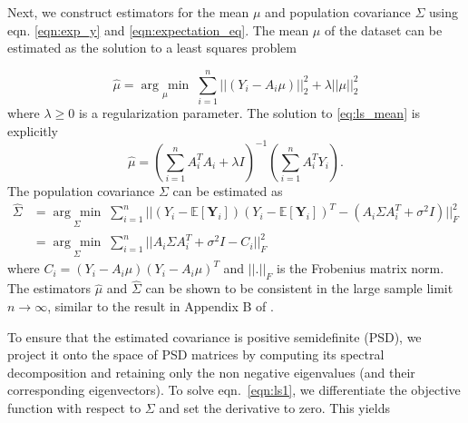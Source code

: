 \documentclass[review]{elsarticle}
\newcommand{\argmin}[1]{\underset{#1}{\operatorname{arg}\,\operatorname{min}}\;}
\begin{document}
Next, we construct estimators for the mean $\mu$ and population covariance 
$\Sigma$ using eqn. \ref{eqn:exp_y} and \ref{eqn:expectation_eq}.
The mean $\mu$ of the dataset can be estimated 
as the solution to
a least squares problem

\begin{equation}
 \hat\mu = \argmin{\mu} \sum_{i=1}^n||(Y_i-A_i\mu)||_2^2 + 
\lambda||\mu||_2^2
\label{eq:ls_mean}
\end{equation}
where $\lambda \geq 0$ is a regularization parameter. The solution to 
\ref{eq:ls_mean} is explicitly
\begin{equation}
 \hat\mu = (\sum_{i=1}^n A_i^T A_i + \lambda I)^{-1}(\sum_{i=1}^n 
A_i^T Y_i).
\label{eq:ls_mean_sol}
\end{equation}
The population covariance $\Sigma$ can be estimated as 
\begin{equation}
\begin{aligned}
\hat\Sigma 
&= \argmin{\Sigma} \sum_{i=1}^n || (Y_i - \mathbb{E}[\textbf{Y}_i]) (Y_i - \mathbb{E}[\textbf{Y}_i])^T
- (A_i \Sigma A_i^T + \sigma^2 I)||_F^2 \\
&= \argmin{\Sigma} \sum_{i=1}^n || A_i\Sigma A_i^T + \sigma^2 I - C_i  ||_F^2 
\end{aligned}
\label{eqn:ls1}
\end{equation}
where $C_i=(Y_i - A_i \mu) (Y_i - A_i \mu)^T$ and $||.||_F$ is the Frobenius matrix norm. 
The estimators $\hat \mu$ and $\hat \Sigma$ can be shown to be consistent in the large sample limit
$n \to \infty$, similar to the result in Appendix B of \cite{gene}. 

To ensure that the estimated
covariance is positive semidefinite (PSD), we project it onto the space of 
PSD matrices by computing
its spectral decomposition and retaining only the non negative eigenvalues (and their corresponding eigenvectors).
To solve eqn.\ \ref{eqn:ls1},
we differentiate the objective function with respect to $\Sigma$ 
and set the derivative to zero. This yields
\end{document}
